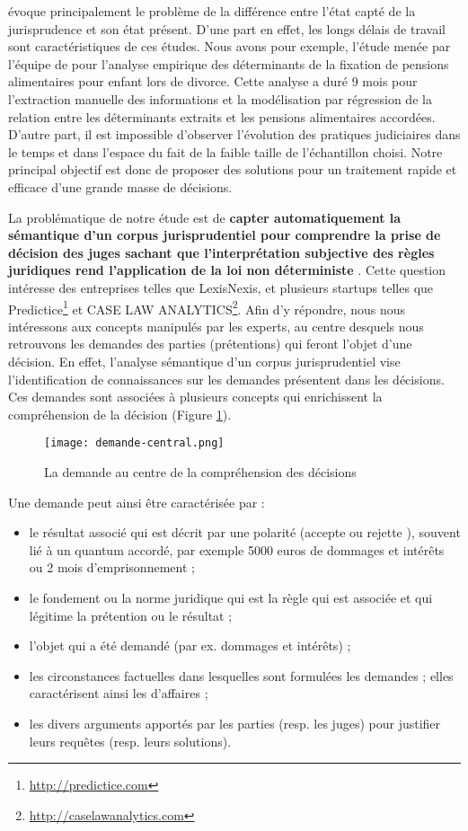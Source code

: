\citet{ancel2003expulsion} évoque principalement le problème de la différence entre l'état capté de la jurisprudence et son état présent. D'une part en effet, les longs délais de travail sont caractéristiques de ces études. Nous avons pour exemple, l'étude menée  par l'équipe de \citet{jeandidier2006pensions} pour l'analyse empirique des déterminants de la fixation de pensions alimentaires pour enfant lors de divorce. Cette analyse a duré 9 mois pour l'extraction manuelle des informations et la modélisation par régression de la relation entre les déterminants extraits et les pensions alimentaires accordées.  D'autre part, il est impossible d'observer l'évolution des pratiques judiciaires dans le temps et dans l'espace du fait de la faible taille de l'échantillon choisi. Notre principal objectif est donc de proposer des solutions pour un traitement rapide et efficace d'une grande masse de décisions. 
 
 La problématique de notre étude est de \og \textbf{capter automatiquement la sémantique d'un corpus jurisprudentiel pour comprendre la prise de décision des juges sachant que l'interprétation subjective des règles juridiques rend l'application de la loi non déterministe} \fg{}. Cette question intéresse des entreprises telles que LexisNexis, et plusieurs startups  telles que Predictice\footnote{\url{http://predictice.com}} et CASE LAW ANALYTICS\footnote{\url{http://caselawanalytics.com}}. Afin d'y répondre, nous nous intéressons aux concepts manipulés par les experts, au centre desquels nous retrouvons les demandes des parties (prétentions) qui feront l'objet d'une décision. En effet, l'analyse sémantique d'un corpus jurisprudentiel vise
 l'identification de connaissances sur les demandes présentent dans les décisions. Ces demandes sont associées à plusieurs concepts  qui enrichissent la compréhension de la décision (Figure \ref{fig:intro:demande-central}).
 \begin{figure}[!htb]
 	\centering
 	\texttt{[image: demande-central.png]}
 	\caption{La demande au centre de la compréhension des décisions}
 	\label{fig:intro:demande-central}
 \end{figure} 

Une demande peut ainsi être caractérisée par :
 \begin{itemize}
	\item le résultat associé qui est décrit par une polarité (\og accepte \fg{} ou \og rejette \fg{}), souvent lié à un quantum accordé, par exemple 5000 euros de dommages et intérêts ou 2 mois d'emprisonnement ;
	\item le fondement ou la norme juridique qui est la règle qui est associée et qui légitime la prétention ou le résultat ;	
	\item l'objet qui a été demandé (par ex. dommages et intérêts) ;
	\item les circonstances factuelles dans lesquelles sont formulées les demandes ; elles caractérisent ainsi les d'affaires ;
	\item les divers arguments apportés par les parties (resp. les juges) pour justifier leurs requêtes (resp. leurs solutions).
 \end{itemize}

